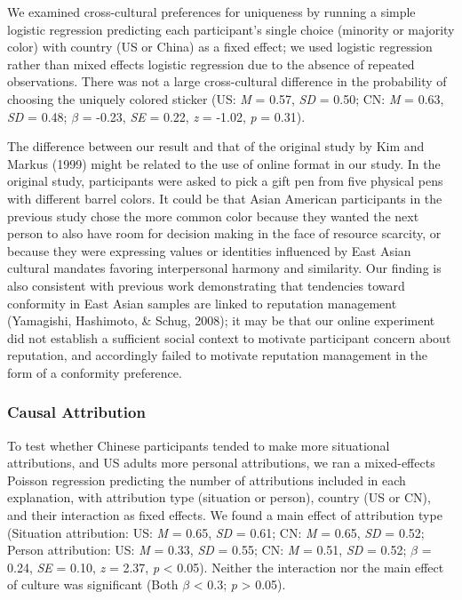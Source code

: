 \documentclass[
  man,floatsintext]{apa6}
\begin{document}
We examined cross-cultural preferences for uniqueness by running a simple logistic regression predicting each participant's single choice (minority or majority color) with country (US or China) as a fixed effect; we used logistic regression rather than mixed effects logistic regression due to the absence of repeated observations. There was not a large cross-cultural difference in the probability of choosing the uniquely colored sticker (US: \emph{M} = 0.57, \emph{SD} = 0.50; CN: \emph{M} = 0.63, \emph{SD} = 0.48; \(\beta\) = -0.23, \emph{SE} = 0.22, \emph{z} = -1.02, \emph{p} = 0.31).

The difference between our result and that of the original study by Kim and Markus (1999) might be related to the use of online format in our study. In the original study, participants were asked to pick a gift pen from five physical pens with different barrel colors. It could be that Asian American participants in the previous study chose the more common color because they wanted the next person to also have room for decision making in the face of resource scarcity, or because they were expressing values or identities influenced by East Asian cultural mandates favoring interpersonal harmony and similarity. Our finding is also consistent with previous work demonstrating that tendencies toward conformity in East Asian samples are linked to reputation management (Yamagishi, Hashimoto, \& Schug, 2008); it may be that our online experiment did not establish a sufficient social context to motivate participant concern about reputation, and accordingly failed to motivate reputation management in the form of a conformity preference.

\hypertarget{causal-attribution-1}{%
\subsubsection{Causal Attribution}\label{causal-attribution-1}}

To test whether Chinese participants tended to make more situational attributions, and US adults more personal attributions, we ran a mixed-effects Poisson regression predicting the number of attributions included in each explanation, with attribution type (situation or person), country (US or CN), and their interaction as fixed effects. We found a main effect of attribution type (Situation attribution: US: \emph{M} = 0.65, \emph{SD} = 0.61; CN: \emph{M} = 0.65, \emph{SD} = 0.52; Person attribution: US: \emph{M} = 0.33, \emph{SD} = 0.55; CN: \emph{M} = 0.51, \emph{SD} = 0.52; \(\beta\) = 0.24, \emph{SE} = 0.10, \emph{z} = 2.37, \emph{p} \textless{} 0.05). Neither the interaction nor the main effect of culture was significant (Both \(\beta\) \textless{} 0.3; \emph{p} \textgreater{} 0.05).
\end{document}
